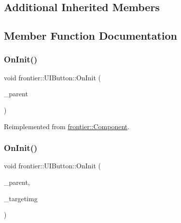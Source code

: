 \subsection*{Additional Inherited Members}


\subsection{Member Function Documentation}
\mbox{\label{classfrontier_1_1_u_i_button_a1c4555865094fdd2dd9dd595740c05b0}} 
\subsubsection{\texorpdfstring{On\+Init()}{OnInit()}\hspace{0.1cm}{\footnotesize\ttfamily [1/2]}}
{\footnotesize\ttfamily void frontier\+::\+U\+I\+Button\+::\+On\+Init (\begin{DoxyParamCaption}\item[{std\+::weak\+\_\+ptr$<$ \hyperlink{classfrontier_1_1_entity}{Entity} $>$}]{\+\_\+parent }\end{DoxyParamCaption})\hspace{0.3cm}{\ttfamily [virtual]}}



Reimplemented from \hyperlink{classfrontier_1_1_component_af3da02905c4d79219d9b12f260a35ad1}{frontier\+::\+Component}.

\mbox{\label{classfrontier_1_1_u_i_button_a4109dc4a0ce449e954f8f7b3c1ca53a9}} 
\subsubsection{\texorpdfstring{On\+Init()}{OnInit()}\hspace{0.1cm}{\footnotesize\ttfamily [2/2]}}
{\footnotesize\ttfamily void frontier\+::\+U\+I\+Button\+::\+On\+Init (\begin{DoxyParamCaption}\item[{std\+::weak\+\_\+ptr$<$ \hyperlink{classfrontier_1_1_entity}{Entity} $>$}]{\+\_\+parent,  }\item[{std\+::weak\+\_\+ptr$<$ \hyperlink{classfrontier_1_1_u_i_image}{U\+I\+Image} $>$}]{\+\_\+targetimg }\end{DoxyParamCaption})}

